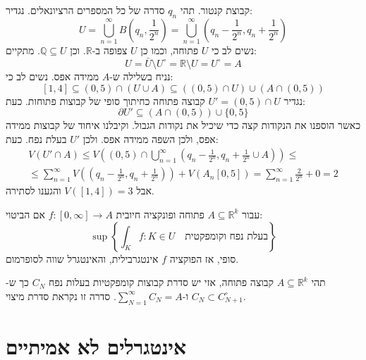 \documentclass{tstextbook}
\begin{document}
\begin{example}
קבוצת קנטור. תהי \(q_{n}\) סדרה של כל המספרים הרציונאלים. נגדיר:
$$U=\bigcup_{n=1}^\infty B\left( q_{n}, \frac{1}{2^n} \right)= \bigcup_{n=1}^\infty \left( q_{n}- \frac{1}{2^n},q_{n}+\frac{1}{2^n} \right)$$
נשים לב כי \(U\) פתוחה, וכמו כן \(U\) צפופה ב-\(\mathbb{R}\). וכן \(\mathbb{Q}\subseteq U\). מתקיים:
$$U=\bar{U}\setminus  U^\circ  = \mathbb{R} \setminus U= U^\circ =A $$
נניח בשלילה ש-\(A\) ממידה אפס. נשים לב כי:
$$[1,4]\subseteq(0,5)\cap\left( U\cup A \right) \subseteq\left( (0,5)\cap U \right)\cup \left( A\cap (0,5)\right)$$
נגדיר \(U'=(0,5)\cap U\) קבוצה פתוחה כחיתוך סופי של קבוצות פתוחות. כעת:
$$\partial U' \subseteq \left( A \cap(0,5) \right)\cup \{ 0,5 \}$$
כאשר הוספנו את הנקודות קצה כדי שיכיל את נקודות הגבול. וקיבלנו איחוד של קבוצות ממידה אפס, ולכן השפה ממידה אפס. ולכן \(U'\) בעלת נפח. כעת:
\begin{gather*} V\left( U'\cap A \right)\leq V\left( (0,5)\cap \bigcup_{n=1}^\infty\left( q_{n}-\frac{1}{2^n},q_{n}+\frac{1}{2^n}\cup A \right) \right)\leq  \\
\leq \sum_{n=1}^\infty V\left( \left( q_{n}-\frac{1}{2^n},q_{n}+\frac{1}{2^n} \right) \right) +V(A_{n}[0,5])=\sum_{n=1}^\infty \frac{2}{2^n}+0=2\end{gather*}
אבל \(V([1,4])=3\) והגענו לסתירה.

\end{example}
\begin{proposition}
עבור \(A\subseteq \mathbb{R}^k\) פתוחה ופונקציה חיובית \(f:\left[ 0,\infty \right]\to A\) אם הביטוי:
$$\operatorname*{sup}\left\lbrace\int_{K}f:K\in U\quad {\text{בעלת נפח וקומפקטית}}\right\rbrace$$
סופי, אז הפוקציה \(f\) אינטגרבילית, והאינטגרל שווה לסופרמום. 

\end{proposition}
\begin{proposition}
תהי \(A\subseteq \mathbb{R}^k\) קבוצה פתוחה, אזי יש סדרת קבוצות קומפקטיות בעלות נפח \(C_{N}\) כך ש-\(C_{N}\subset C^\circ_{N+1}\) ו-\(\sum_{N=1}^\infty C_{N}=A\). סדרה זו נקראת סדרת מיצוי.

\end{proposition}
\section{אינטגרלים לא אמיתיים}
\end{document}
